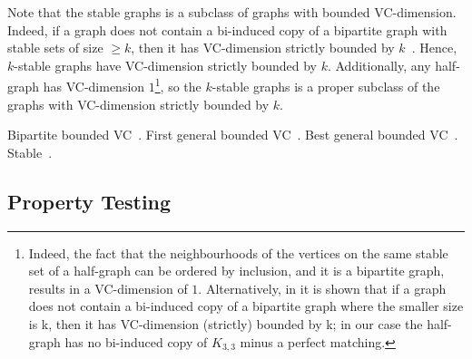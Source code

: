     Note that the stable graphs is a subclass of graphs with bounded VC-dimension.
    Indeed, if a graph does not contain a bi-induced copy of a bipartite graph with stable sets of size $\geq k$,
    then it has VC-dimension strictly bounded by $k$~\cite{regularity_partitions_and_the_topology_of_graphons}.
    Hence, $k$-stable graphs have VC-dimension strictly bounded by $k$.
    Additionally, any half-graph has VC-dimension $1$\footnote{
        Indeed, the fact that the neighbourhoods of the vertices on the same stable set of a half-graph can be
        ordered by inclusion, and it is a bipartite graph, results in a VC-dimension of $1$.
        Alternatively, in \cite{regularity_partitions_and_the_topology_of_graphons} it is shown that if a graph does not
        contain a bi-induced copy of a bipartite graph where the smaller size is k, then it has VC-dimension (strictly)
        bounded by k; in our case the half-graph has no bi-induced copy of $K_{3,3}$ minus a perfect matching.},
    so the $k$-stable graphs is a proper subclass of the graphs with VC-dimension strictly bounded by $k$.

    Bipartite bounded VC~\cite{efficient_testing_of_bipartite_graphs_for_forbidden_induced_subgraphs}.
    First general bounded VC~\cite{regularity_partitions_and_the_topology_of_graphons}.
    Best general bounded VC~\cite{erdos_hajnal_conjecture_for_graphs_with_bounded_vc_dimension}.
    Stable~\cite{regularity_lemmas_for_stable_graphs}.





    \subsection{Property Testing}



